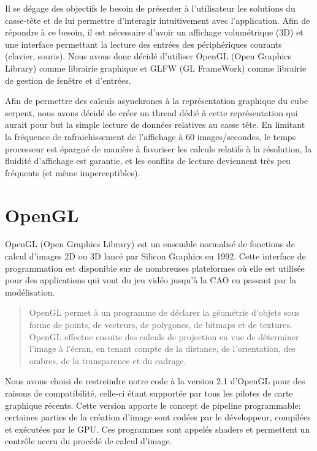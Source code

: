 Il se dégage des objectifs le besoin de présenter à l'utilisateur les solutions du casse-tête et de lui permettre d'interagir intuitivement avec l'application. Afin de répondre à ce besoin, il est nécessaire d'avoir un affichage volumétrique (3D) et une interface permettant la lecture des entrées des périphériques courants (clavier, souris). Nous avons donc décidé d'utiliser OpenGL (Open Graphics Library) comme librairie graphique et GLFW (GL FrameWork) comme librairie de gestion de fenêtre et d'entrées.

Afin de permettre des calculs asynchrones à la représentation graphique du cube serpent, nous avons décidé de créer un thread dédié à cette représentation qui aurait pour but la simple lecture de données relatives au casse tête. En limitant la fréquence de rafraichissement de l'affichage à 60 images/secondes, le temps processeur est épargné de manière à favoriser les calculs relatifs à la résolution,  la fluidité d'affichage est garantie, et les conflits de lecture deviennent très peu fréquents (et même imperceptibles).

\section{OpenGL}

OpenGL (Open Graphics Library) est un ensemble normalisé de fonctions de calcul d'images 2D ou 3D lancé par Silicon Graphics en 1992. Cette interface de programmation est disponible sur de nombreuses plateformes où elle est utilisée pour des applications qui vont du jeu vidéo jusqu'à la CAO en passant par la modélisation.

\begin{quotation}
 OpenGL permet à un programme de déclarer la géométrie d'objets sous forme de points, de vecteurs, de polygones, de bitmaps et de textures. OpenGL effectue ensuite des calculs de projection en vue de déterminer l'image à l'écran, en tenant compte de la distance, de l'orientation, des ombres, de la transparence et du cadrage.
\end{quotation}

Nous avons choisi de restreindre notre code à la version 2.1 d'OpenGL pour des raisons de compatibilité, celle-ci étant supportée par tous les pilotes de carte graphique récents. Cette version apporte le concept de pipeline programmable: certaines parties de la création d'image sont codées par le développeur, compilées et exécutées par le GPU. Ces programmes sont appelés shaders et permettent un contrôle accru du procédé de calcul d'image.

